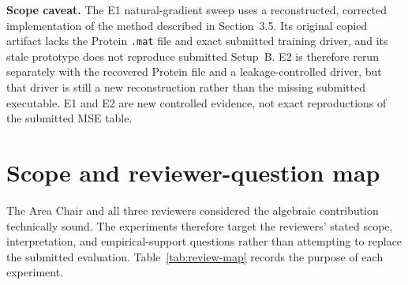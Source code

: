 \documentclass[11pt]{article}
\newcommand{\ours}{\textsc{Ours}}
\newcommand{\refact}{\textsc{Refact}}
\newcommand{\caveat}[1]{\par\noindent\colorbox{yellow!18}{%
  \parbox{\dimexpr\linewidth-2\fboxsep\relax}{\textbf{Scope caveat.} #1}}\par}
\begin{document}
\begin{abstract}
The results sharpen rather than uniformly strengthen the original claims.
The refresh threshold controls a clear refresh-frequency--accuracy trade-off.
At matched \(r=1024\), the corrected E2 rerun gives a paired
\ours{}--\refact{} test-MSE difference of
\(0.0051\pm0.0058\), providing no accuracy-win evidence for the exact update.
A thin factor that remains factorized favors one-sided propagation, whereas
explicit dense materialization favors the proposed two-sided representation.
Positive updates remain backward stable but forward error reflects the
conditioning of whitening; downdate amplification exactly follows the
\((1-\ell)^{-1}\) bound.  The fused CUDA kernel benefits strongly from
independent-update batching, and an exact prefix-scan fallback is
\(1.8\)--\(2.1\times\) faster than CUDA refactorization at
\(r=256\)--1024.  A separately labeled inverse-factor representation is
\(3.3\)--\(12.2\times\) faster in held-out cached-state kernel timing at
\(r=256\)--1024.  Its synthetic self-contained four-state ladder reaches
\(71.3\pm0.1\times\) at \(r=65{,}536\), and the independently locked
real-trajectory ladder reaches \(71.755\pm0.225\times\) at the same rank
while passing every predeclared correctness gate.  Repeated-update and
refresh tests show low drift for well-conditioned problems but strong
condition dependence.  Repeated rank-one updates are advantageous for small
\(k\), but their measured crossover occurs much earlier than a FLOP-only
model predicts.  We state below precisely which claims these data support and
which manuscript statements should be weakened.
\end{abstract}

\caveat{The E1 natural-gradient sweep uses a reconstructed, corrected
implementation of the method described in Section~3.5.  Its original copied
artifact lacks the Protein \texttt{.mat} file and exact submitted training
driver, and its stale prototype does not reproduce submitted Setup~B.  E2 is
therefore rerun separately with the recovered Protein file and a
leakage-controlled driver, but that driver is still a new reconstruction
rather than the missing submitted executable.  E1 and E2 are new controlled
evidence, not exact reproductions of the submitted MSE table.}

\section{Scope and reviewer-question map}
\label{sec:scope}

The Area Chair and all three reviewers considered the algebraic contribution
technically sound.  The experiments therefore target the reviewers' stated
scope, interpretation, and empirical-support questions rather than attempting
to replace the submitted evaluation.  Table~\ref{tab:review-map} records the
purpose of each experiment.
\end{document}
